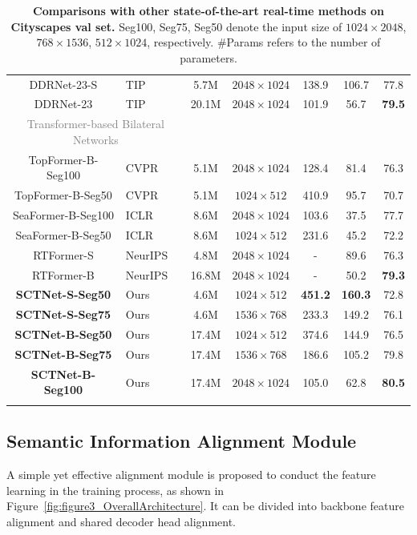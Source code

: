\documentclass[letterpaper]{article} %
\begin{document}
\begin{table}[t]
\begin{tabular}{c l|c|c|c|c|c}
    DDRNet-23-S &TIP~\citeyear{pan2022deep} &5.7M &$2048 \times 1024$ &138.9 &106.7 &77.8 \\
    DDRNet-23 &TIP~\citeyear{pan2022deep} &20.1M &$2048 \times 1024$ &101.9 &56.7 &\textbf{79.5} \\
    \hline
    \multicolumn{2}{c|}{\textcolor{gray}{Transformer-based Bilateral Networks}} & &  & & &\\
    TopFormer-B-Seg100 &CVPR~\citeyear{zhang2022topformer}    &5.1M &$2048 \times 1024$ &128.4 &81.4 &76.3 \\
    TopFormer-B-Seg50  &CVPR~\citeyear{zhang2022topformer}    &5.1M &$1024 \times 512$ &410.9 &95.7 &70.7\\
    SeaFormer-B-Seg100 &ICLR~\citeyear{wan2023seaformer}    &8.6M &$2048 \times 1024$ &103.6 &37.5 &77.7 \\
    SeaFormer-B-Seg50 &ICLR~\citeyear{wan2023seaformer} &8.6M &$1024 \times 512$ &231.6 &45.2 &72.2 \\
    RTFormer-S &NeurIPS~\citeyear{wang2022rtformer}    &4.8M &$2048 \times 1024$ &- &89.6 &76.3 \\
    RTFormer-B &NeurIPS~\citeyear{wang2022rtformer}    &16.8M &$2048 \times 1024$ &- &50.2 &\textbf{79.3} \\
    \hline
    \textbf{SCTNet-S-Seg50}  &Ours &4.6M &$1024 \times 512$ &\textbf{451.2} &\textbf{160.3} &72.8\\
    \textbf{SCTNet-S-Seg75} &Ours &4.6M &$1536 \times 768$ &233.3 &149.2 &76.1 \\
    \textbf{SCTNet-B-Seg50}  &Ours &17.4M &$1024 \times 512$ &374.6 &144.9 &76.5 \\
    \textbf{SCTNet-B-Seg75}  &Ours &17.4M &$1536 \times 768$ &186.6 &105.2 &79.8\\
    \textbf{SCTNet-B-Seg100} &Ours &17.4M &$2048 \times 1024$ &105.0  &62.8 &\textbf{80.5} \\
    \Xhline{1pt}
  \end{tabular}
\caption{\textbf{Comparisons with other state-of-the-art real-time methods on Cityscapes val set.} Seg100, Seg75, Seg50 denote the input size of $1024\times2048$, $768\times1536$, $512\times1024$, respectively. \#Params refers to the number of parameters.
}
  \label{tab:sample-tableSOTA}
\vspace{-10pt}
\end{table}


\subsection{Semantic Information Alignment Module}
A simple yet effective alignment module is proposed to conduct the feature learning in the training process, as shown in Figure~\ref{fig:figure3_OverallArchitecture}. It can be divided into backbone feature alignment and shared decoder head alignment.
\end{document}
